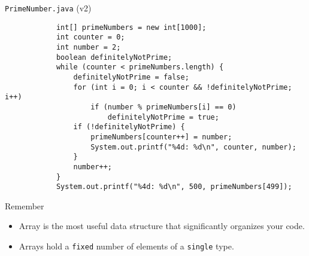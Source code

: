 \documentclass[10pt, compress]{beamer}
\begin{document}
\begin{slide}
	\begin{block}{\texttt{PrimeNumber.java} (v2)}
		\begin{verbatim}
			int[] primeNumbers = new int[1000];
			int counter = 0;
			int number = 2;
			boolean definitelyNotPrime;
			while (counter < primeNumbers.length) {
			    definitelyNotPrime = false;
			    for (int i = 0; i < counter && !definitelyNotPrime; i++)
			        if (number % primeNumbers[i] == 0)
			            definitelyNotPrime = true;
			    if (!definitelyNotPrime) {
			        primeNumbers[counter++] = number;
			        System.out.printf("%4d: %d\n", counter, number);
			    }
			    number++;
			}
			System.out.printf("%4d: %d\n", 500, primeNumbers[499]);
		\end{verbatim}
	\end{block}
\end{slide}

\begin{slide}
	\begin{block}{Remember}
		\begin{itemize}
			\item[] Array is the most useful data structure that significantly organizes your code.
			\item[] Arrays hold a \texttt{fixed} number of elements of a \texttt{single} type.
		\end{itemize}
	\end{block}
\end{slide}

\end{document}
